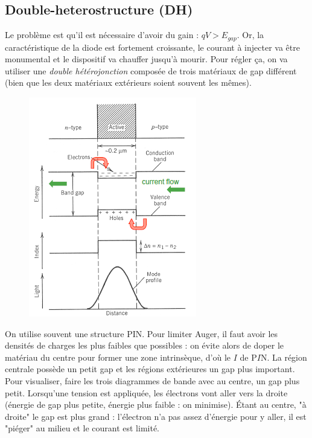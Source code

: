 \subsection{Double-heterostructure (DH)}
Le problème est qu'il est nécessaire d'avoir du gain : $qV >E_{gap}$. Or, la caractéristique de la
diode est fortement croissante, le courant à injecter va être monumental et le dispositif va chauffer
jusqu'à mourir. Pour régler ça, on va utiliser une \textit{double hétérojonction} composée de trois
matériaux de gap différent (bien que les deux matériaux extérieurs soient souvent les mêmes). \\

	\begin{figure}
	\vspace{-5mm}
	\includegraphics[scale=0.75]{ch4/image6}
	\end{figure}
On utilise souvent une structure PIN. Pour limiter Auger, il faut avoir les densités de charges les
plus faibles que possibles : on évite alors de doper le matériau du centre pour former une zone 
intrinsèque, d'où le $I$ de P$I$N. La région centrale possède un petit gap et les régions extérieures
un gap plus important. Pour visualiser, faire les trois diagrammes de bande avec au centre, un gap plus 
petit. Lorsqu'une tension est appliquée, les électrons vont aller vers la droite (énergie de gap plus
petite, énergie plus faible : on minimise). Étant au centre, "à droite" le gap est plus grand : 
l'électron n'a pas assez d'énergie pour y aller, il est "piéger" au milieu et le courant est limité.\\

